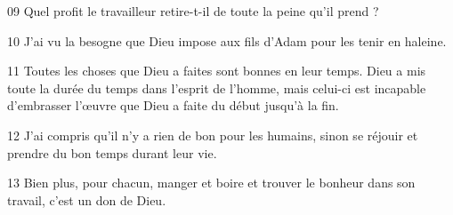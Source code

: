 
09 Quel profit le travailleur retire-t-il de toute la peine qu’il prend ?

10 J’ai vu la besogne que Dieu impose aux fils d’Adam pour les tenir en haleine.

11 Toutes les choses que Dieu a faites sont bonnes en leur temps. Dieu a mis toute la durée du temps dans l’esprit de l’homme, mais celui-ci est incapable d’embrasser l’œuvre que Dieu a faite du début jusqu’à la fin.

12 J’ai compris qu’il n’y a rien de bon pour les humains, sinon se réjouir et prendre du bon temps durant leur vie.

13 Bien plus, pour chacun, manger et boire et trouver le bonheur dans son travail, c’est un don de Dieu.
